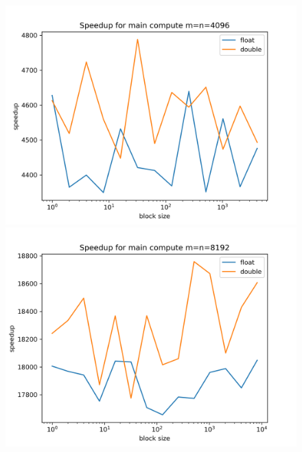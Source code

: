\documentclass[a4paper]{article}
\begin{document}
\begin{figure}[h!]
\begin{minipage}{0.45\linewidth}
			\includegraphics[width=\linewidth]{../comparison_plots/compute_plot_m4096.png}
		\end{minipage}%
		\begin{minipage}{0.45\linewidth}
			\centering
			\includegraphics[width=\linewidth]{../comparison_plots/compute_plot_m8192.png}
		\end{minipage}
	\end{figure}
\end{document}
